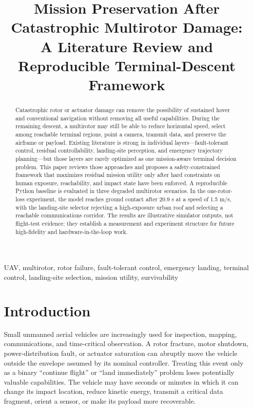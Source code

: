 \documentclass[conference]{IEEEtran}
\title{Mission Preservation After Catastrophic Multirotor Damage:\\
A Literature Review and Reproducible Terminal-Descent Framework}
\author{\IEEEauthorblockN{Research Baseline}
\IEEEauthorblockA{Mission-Preservation UAV Project\\
FR-project repository}}
\begin{document}
\maketitle

\begin{abstract}
Catastrophic rotor or actuator damage can remove the possibility of sustained
hover and conventional navigation without removing all useful capabilities.
During the remaining descent, a multirotor may still be able to reduce
horizontal speed, select among reachable terminal regions, point a camera,
transmit data, and preserve the airframe or payload. Existing literature is
strong in individual layers---fault-tolerant control, residual controllability,
landing-site perception, and emergency trajectory planning---but those layers
are rarely optimized as one mission-aware terminal decision problem. This paper
reviews those approaches and proposes a safety-constrained framework that
maximizes residual mission utility only after hard constraints on human
exposure, reachability, and impact state have been enforced. A reproducible
Python baseline is evaluated in three degraded multirotor scenarios. In the
one-rotor-loss experiment, the model reaches ground contact after 20.9 s at a
speed of 1.5 m/s, with the landing-site selector rejecting a high-exposure
urban roof and selecting a reachable communications corridor. The results are
illustrative simulator outputs, not flight-test evidence; they establish a
measurement and experiment structure for future high-fidelity and
hardware-in-the-loop work.
\end{abstract}

\begin{IEEEkeywords}
UAV, multirotor, rotor failure, fault-tolerant control, emergency landing,
terminal control, landing-site selection, mission utility, survivability
\end{IEEEkeywords}

\section{Introduction}
Small unmanned aerial vehicles are increasingly used for inspection, mapping,
communications, and time-critical observation. A rotor fracture, motor
shutdown, power-distribution fault, or actuator saturation can abruptly move
the vehicle outside the envelope assumed by its nominal controller. Treating
this event only as a binary ``continue flight'' or ``land immediately'' problem
loses potentially valuable capabilities. The vehicle may have seconds or
minutes in which it can change its impact location, reduce kinetic energy,
transmit a critical data fragment, orient a sensor, or make its payload more
recoverable.
\end{document}
